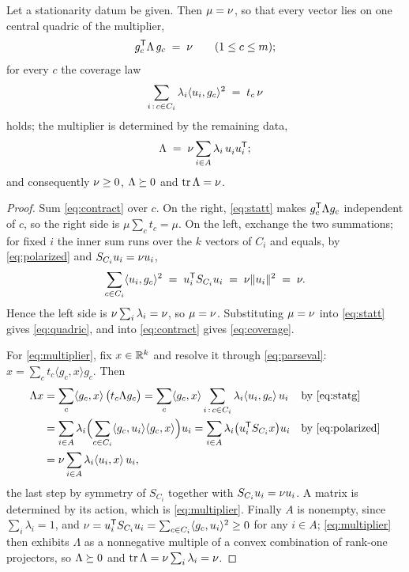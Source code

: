 \begin{proposition}[Lean]\label{prop:quadric}
Let a stationarity datum be given.  Then $\mu=\nu$, so that every vector
lies on one central quadric of the multiplier,
\begin{equation}\label{eq:quadric}
  g_c^{\mathsf{T}}\Lambda\,g_c\;=\;\nu\qquad(1\le c\le m);
\end{equation}
for every $c$ the coverage law
\begin{equation}\label{eq:coverage}
  \sum_{i\,:\,c\in C_i}\lambda_i\langle u_i,g_c\rangle^2\;=\;t_c\,\nu
\end{equation}
holds; the multiplier is determined by the remaining data,
\begin{equation}\label{eq:multiplier}
  \Lambda\;=\;\cv\sum_{i\in A}\lambda_i\,u_i^{\vphantom{\mathsf{T}}}u_i\tp;
\end{equation}
and consequently $\nu\ge0$, $\Lambda\succeq0$ and $\operatorname{tr}\Lambda=\nu$.
\end{proposition}

\begin{proof}
Sum \eqref{eq:contract} over $c$.  On the right, \eqref{eq:statt} makes
$g_c^{\mathsf{T}}\Lambda g_c$ independent of $c$, so the right side is
$\mu\sum_ct_c=\mu$.  On the left, exchange the two summations; for fixed
$i$ the inner sum runs over the $k$ vectors of $C_i$ and equals, by
\eqref{eq:polarized} and $S_{C_i}u_i=\nu u_i$,
\[
  \sum_{c\in C_i}\langle u_i,g_c\rangle^2
  \;=\;u_i^{\mathsf{T}} S_{C_i}u_i\;=\;\nu\lVert u_i\rVert^2\;=\;\nu .
\]
Hence the left side is $\nu\sum_i\lambda_i=\nu$, so $\mu=\nu$.  Substituting
$\mu=\nu$ into \eqref{eq:statt} gives \eqref{eq:quadric}, and into
\eqref{eq:contract} gives \eqref{eq:coverage}.

For \eqref{eq:multiplier}, fix $x\in\mathbb{R}^k$ and resolve it through
\eqref{eq:parseval}: $x=\sum_ct_c\langle g_c,x\rangle g_c$.  Then
\begin{align*}
  \Lambda x
  &=\sum_c\langle g_c,x\rangle\,\bigl(t_c\Lambda g_c\bigr)
   =\sum_c\langle g_c,x\rangle
      \sum_{i\,:\,c\in C_i}\lambda_i\langle u_i,g_c\rangle\,u_i
  &&\text{by \eqref{eq:statg}}\\
  &=\sum_{i\in A}\lambda_i
      \Bigl(\sum_{c\in C_i}\langle g_c,u_i\rangle
        \langle g_c,x\rangle\Bigr)u_i
   =\sum_{i\in A}\lambda_i\bigl(u_i^{\mathsf{T}} S_{C_i}x\bigr)u_i
  &&\text{by \eqref{eq:polarized}}\\
  &=\nu\sum_{i\in A}\lambda_i\langle u_i,x\rangle\,u_i ,
\end{align*}
the last step by symmetry of $S_{C_i}$ together with
$S_{C_i}u_i=\nu u_i$.  A matrix is determined by its action, which is
\eqref{eq:multiplier}.  Finally $A$ is nonempty, since $\sum_i\lambda_i=1$,
and $\nu=u_i^{\mathsf{T}} S_{C_i}u_i=\sum_{c\in C_i}\langle g_c,u_i\rangle^2\ge0$ for
any $i\in A$; \eqref{eq:multiplier} then exhibits $\Lambda$ as a nonnegative
multiple of a convex combination of rank-one projectors, so
$\Lambda\succeq0$ and $\operatorname{tr}\Lambda=\nu\sum_i\lambda_i=\nu$.
\end{proof}

